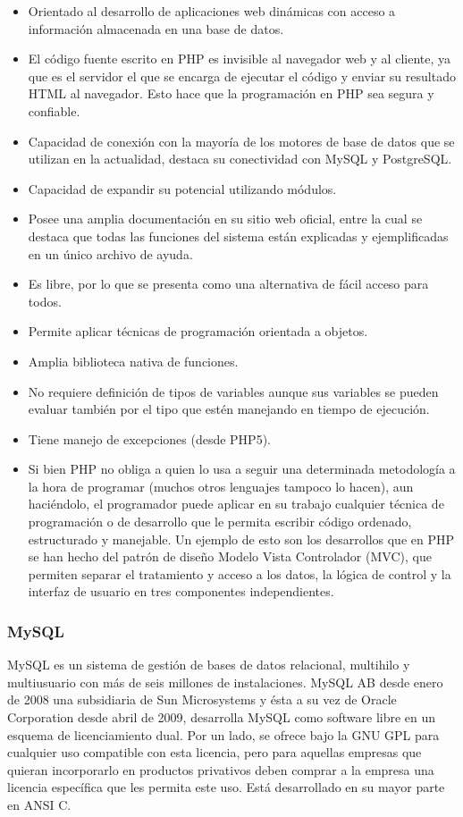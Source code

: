\begin{itemize}
\item Orientado al desarrollo de aplicaciones web dinámicas con acceso a información almacenada en una base de datos.
\item El código fuente escrito en PHP es invisible al navegador web y al cliente, ya que es el servidor el que se encarga de ejecutar el código y enviar su resultado HTML al navegador. Esto hace que la programación en PHP sea segura y confiable.
\item Capacidad de conexión con la mayoría de los motores de base de datos que se utilizan en la actualidad, destaca su conectividad con MySQL y PostgreSQL.
\item Capacidad de expandir su potencial utilizando módulos.
\item Posee una amplia documentación en su sitio web oficial, entre la cual se destaca que todas las funciones del sistema están explicadas y ejemplificadas en un único archivo de ayuda.
\item Es libre, por lo que se presenta como una alternativa de fácil acceso para todos.
\item Permite aplicar técnicas de programación orientada a objetos.
\item Amplia biblioteca nativa de funciones.
\item No requiere definición de tipos de variables aunque sus variables se pueden evaluar también por el tipo que estén manejando en tiempo de ejecución.
\item Tiene manejo de excepciones (desde PHP5).
\item Si bien PHP no obliga a quien lo usa a seguir una determinada metodología a la hora de programar (muchos otros lenguajes tampoco lo hacen), aun haciéndolo, el programador puede aplicar en su trabajo cualquier técnica de programación o de desarrollo que le permita escribir código ordenado, estructurado y manejable. Un ejemplo de esto son los desarrollos que en PHP se han hecho del patrón de diseño Modelo Vista Controlador (MVC), que permiten separar el tratamiento y acceso a los datos, la lógica de control y la interfaz de usuario en tres componentes independientes.
\end{itemize}

\subsubsection{MySQL}
	MySQL es un sistema de gestión de bases de datos relacional, multihilo y multiusuario con más de seis millones de instalaciones. MySQL AB desde enero de 2008 una subsidiaria de Sun Microsystems y ésta a su vez de Oracle Corporation desde abril de 2009, desarrolla MySQL como software libre en un esquema de licenciamiento dual. Por un lado, se ofrece bajo la GNU GPL para cualquier uso compatible con esta licencia, pero para aquellas empresas que quieran incorporarlo en productos privativos deben comprar a la empresa una licencia específica que les permita este uso. Está desarrollado en su mayor parte en ANSI C.\\

